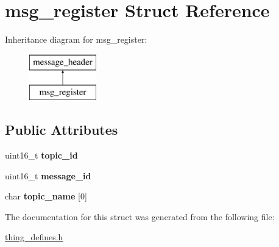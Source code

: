 \hypertarget{structmsg__register}{\section{msg\-\_\-register Struct Reference}
\label{structmsg__register}
}
Inheritance diagram for msg\-\_\-register\-:\begin{figure}[H]
\begin{center}
\leavevmode
\includegraphics[height=2.000000cm]{structmsg__register}
\end{center}
\end{figure}
\subsection*{Public Attributes}
\begin{DoxyCompactItemize}
\item 
\hypertarget{structmsg__register_ad99373ef209dd1bc1ac76cf00b38483a}{uint16\-\_\-t {\bfseries topic\-\_\-id}}\label{structmsg__register_ad99373ef209dd1bc1ac76cf00b38483a}

\item 
\hypertarget{structmsg__register_a069b62ae801b9a413b293b0939b2b685}{uint16\-\_\-t {\bfseries message\-\_\-id}}\label{structmsg__register_a069b62ae801b9a413b293b0939b2b685}

\item 
\hypertarget{structmsg__register_ae2399455c0b7f86010781bf6e37ab619}{char {\bfseries topic\-\_\-name} \mbox{[}0\mbox{]}}\label{structmsg__register_ae2399455c0b7f86010781bf6e37ab619}

\end{DoxyCompactItemize}


The documentation for this struct was generated from the following file\-:\begin{DoxyCompactItemize}
\item 
\hyperlink{thing__defines_8h}{thing\-\_\-defines.\-h}\end{DoxyCompactItemize}
